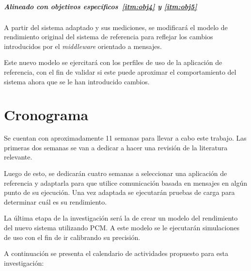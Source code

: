\documentclass[11pt, twoside]{report}
\begin{document}
\paragraph{Alineado con objetivos específicos~\ref{itm:obj4} y \ref{itm:obj5}}

\paragraph{}A partir del sistema adaptado y sus mediciones, se modificará el modelo de rendimiento original del sistema de referencia para reflejar los cambios introducidos por el \emph{middleware} orientado a mensajes.

Este nuevo modelo se ejercitará con los perfiles de uso de la aplicación de referencia, con el fin de validar si este puede aproximar el comportamiento del sistema ahora que se le han introducido cambios. 

\chapter{Cronograma}
Se cuentan con aproximadamente 11 semanas para llevar a cabo este trabajo. Las primeras dos semanas se van a dedicar a hacer una revisión de la literatura relevante. 

Luego de esto, se dedicarán cuatro semanas a seleccionar una aplicación de referencia y adaptarla para que utilice comunicación basada en mensajes en algún punto de su ejecución. Una vez adaptada se ejecutarán pruebas de carga para determinar cuál es su rendimiento. 

La última etapa de la investigación será la de crear un modelo del rendimiento del nuevo sistema utilizando PCM. A este modelo se le ejecutarán simulaciones de uso con el fin de ir calibrando su precisión.

A continuación se presenta el calendario de actividades propuesto para esta investigación: 



\end{document}
